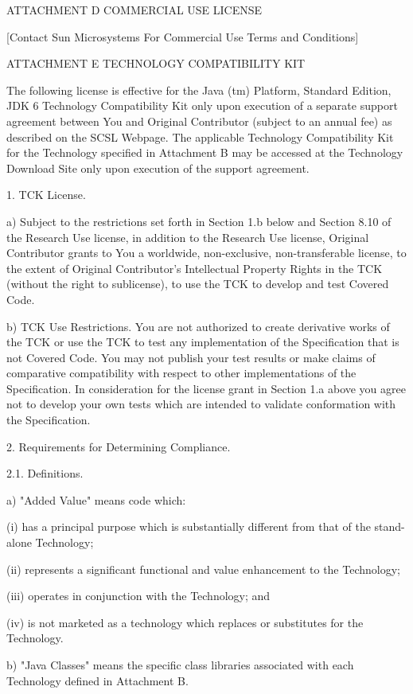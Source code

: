 {ATTACHMENT D COMMERCIAL USE LICENSE

[Contact Sun Microsystems For Commercial Use Terms and Conditions]
 
ATTACHMENT E TECHNOLOGY COMPATIBILITY KIT

The following license is effective for the Java (tm) Platform,
Standard Edition, JDK 6 Technology Compatibility Kit only upon
execution of a separate support agreement between You and Original
Contributor (subject to an annual fee) as described on the SCSL
Webpage.  The applicable Technology Compatibility Kit for the
Technology specified in Attachment B may be accessed at the Technology
Download Site only upon execution of the support agreement.

1.  TCK License.

a) Subject to the restrictions set forth in Section 1.b below and
Section 8.10 of the Research Use license, in addition to the Research
Use license, Original Contributor grants to You a worldwide,
non-exclusive, non-transferable license, to the extent of Original
Contributor's Intellectual Property Rights in the TCK (without the
right to sublicense), to use the TCK to develop and test Covered Code.

b) TCK Use Restrictions.  You are not authorized to create derivative
works of the TCK or use the TCK to test any implementation of the
Specification that is not Covered Code.  You may not publish your test
results or make claims of comparative compatibility with respect to
other implementations of the Specification.  In consideration for the
license grant in Section 1.a above you agree not to develop your own
tests which are intended to validate conformation with the
Specification.

2.  Requirements for Determining Compliance.

2.1.  Definitions.

a) "Added Value" means code which:

(i) has a principal purpose which is substantially different from that
of the stand-alone Technology;

(ii) represents a significant functional and value enhancement to the
Technology;

(iii) operates in conjunction with the Technology; and

(iv) is not marketed as a technology which replaces or substitutes for
the Technology.

b) "Java Classes" means the specific class libraries associated with
each Technology defined in Attachment B.

}
